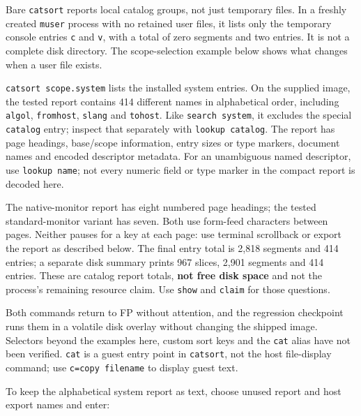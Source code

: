 Bare \passthrough{\lstinline!catsort!} reports local catalog groups, not just temporary files. In a freshly created \passthrough{\lstinline!muser!} process with no retained user files, it lists only the temporary console entries \passthrough{\lstinline!c!} and \passthrough{\lstinline!v!}, with a total of zero segments and two entries. It is not a complete disk directory. The scope-selection example below shows what changes when a user file exists.

\passthrough{\lstinline!catsort scope.system!} lists the installed system entries. On the supplied image, the tested report contains 414 different names in alphabetical order, including \passthrough{\lstinline!algol!}, \passthrough{\lstinline!fromhost!}, \passthrough{\lstinline!slang!} and \passthrough{\lstinline!tohost!}. Like \passthrough{\lstinline!search system!}, it excludes the special \passthrough{\lstinline!catalog!} entry; inspect that separately with \passthrough{\lstinline!lookup catalog!}. The report has page headings, base/scope information, entry sizes or type markers, document names and encoded descriptor metadata. For an unambiguous named descriptor, use \passthrough{\lstinline!lookup name!}; not every numeric field or type marker in the compact report is decoded here.

The native-monitor report has eight numbered page headings; the tested standard-monitor variant has seven. Both use form-feed characters between pages. Neither pauses for a key at each page: use terminal scrollback or export the report as described below. The final entry total is 2,818 segments and 414 entries; a separate disk summary prints 967 slices, 2,901 segments and 414 entries. These are catalog report totals, \textbf{not free disk space} and not the process's remaining resource claim. Use \passthrough{\lstinline!show!} and \passthrough{\lstinline!claim!} for those questions.

Both commands return to FP without attention, and the regression checkpoint runs them in a volatile disk overlay without changing the shipped image. Selectors beyond the examples here, custom sort keys and the \passthrough{\lstinline!cat!} alias have not been verified. \passthrough{\lstinline!cat!} is a guest entry point in \passthrough{\lstinline!catsort!}, not the host file-display command; use \passthrough{\lstinline!c=copy filename!} to display guest text.

To keep the alphabetical system report as text, choose unused report and host export names and enter:

